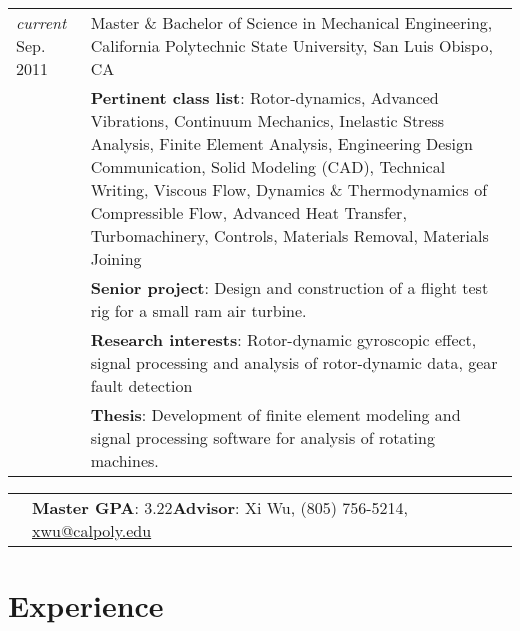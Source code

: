 \documentclass[10pt]{article} %
\newcommand{\secspace}{.25em}
\begin{document}
\begin{tabular}{p{.6in}|p{5.5in}}	
	\emph{current} Sep. 2011 & Master \& Bachelor of Science in Mechanical Engineering,  California Polytechnic State University, San Luis Obispo, CA\\
	& \footnotesize{\textbf{Pertinent class list}: Rotor-dynamics, Advanced Vibrations, Continuum Mechanics, Inelastic Stress Analysis, Finite Element Analysis, Engineering Design Communication, Solid Modeling (CAD), Technical Writing, Viscous Flow, Dynamics \& Thermodynamics of Compressible Flow, Advanced Heat Transfer, Turbomachinery, Controls, Materials Removal, Materials Joining}\\
	& \footnotesize{\textbf{Senior project}: Design and construction of a flight test rig for a small ram air turbine.}\\
	& \footnotesize{\textbf{Research interests}: Rotor-dynamic gyroscopic effect, signal processing and analysis of rotor-dynamic data, gear fault detection}\\
	& \footnotesize{\textbf{Thesis}: Development of finite element modeling and signal processing software for analysis of rotating machines.}\\
\end{tabular}\par \vspace{-.5em}
\begin{tabular}{p{.6in}p{5.5in}}	
	&\footnotesize{\textbf{Master GPA}: 3.22\hfill  \textbf{Advisor}: Xi Wu, (805) 756-5214}, \href{mailto:xwu@calpoly.edu}{xwu@calpoly.edu}\\[\secspace]
\end{tabular}



\section{Experience}
\end{document}
